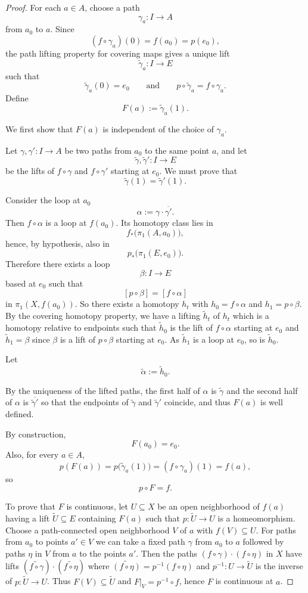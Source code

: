 \documentclass{article}
\begin{document}
\begin{proof}
For each \(a \in A\), choose a path
\[
\gamma_a : I \to A
\]
from \(a_0\) to \(a\). Since
\[
(f\circ \gamma_a)(0)=f(a_0)=p(e_0),
\]
the path lifting property for covering maps gives a unique lift
\[
\widetilde{\gamma}_a : I \to E
\]
such that
\[
\widetilde{\gamma}_a(0)=e_0
\qquad\text{and}\qquad
p\circ \widetilde{\gamma}_a=f\circ \gamma_a.
\]
Define
\[
F(a):=\widetilde{\gamma}_a(1).
\]

We first show that \(F(a)\) is independent of the choice of \(\gamma_a\).

Let \(\gamma,\gamma' : I \to A\) be two paths from \(a_0\) to the same point \(a\), and let
\[
\widetilde{\gamma},\widetilde{\gamma}' : I \to E
\]
be the lifts of \(f\circ \gamma\) and \(f\circ \gamma'\) starting at \(e_0\). We must prove that
\[
\widetilde{\gamma}(1)=\widetilde{\gamma}'(1).
\]

Consider the loop at \(a_0\)
\[
\alpha:=\gamma\cdot \overline{\gamma'}.
\]
Then \(f\circ \alpha\) is a loop at \(f(a_0)\). Its homotopy class lies in
\[
f_*\bigl(\pi_1(A,a_0)\bigr),
\]
hence, by hypothesis, also in
\[
p_*\bigl(\pi_1(E,e_0)\bigr).
\]
Therefore there exists a loop
\[
\beta : I \to E
\]
based at \(e_0\) such that
\[
[p\circ \beta]=[f\circ \alpha]
\]
in \(\pi_1(X,f(a_0))\). So there exists a homotopy $h_t$ with $h_0 = f \circ \alpha$ and $h_1 = p \circ \beta$. By the covering homotopy property, we have a lifting $\widetilde{h}_t$ of $h_t$ which is a homotopy relative to endpoints such that $\widetilde{h}_0$ is the lift of $f \circ \alpha$ starting at $e_0$ and $\widetilde{h}_1 = \beta$ since $\beta$ is a lift of $p \circ \beta$ starting at $e_0$. As $\widetilde{h}_1$ is a loop at $e_0$, so is $\widetilde{h}_0$.

Let
\[
\widetilde{\alpha} := \widetilde{h}_0.
\]

By the uniqueness of the lifted paths, the first half of $\alpha$ is $\widetilde{\gamma}$ and the second half of $\alpha$ is $\overline{\widetilde{\gamma}'}$ so that the endpoints of $\widetilde{\gamma}$ and $\widetilde{\gamma}'$ coincide, and thus \(F(a)\) is well defined.

By construction,
\[
F(a_0)=e_0.
\]
Also, for every \(a\in A\),
\[
p(F(a))
=
p\bigl(\widetilde{\gamma}_a(1)\bigr)
=
(f\circ \gamma_a)(1)
=
f(a),
\]
so
\[
p\circ F=f.
\]

To prove that \(F\) is continuous, let \(U \subseteq X\) be an open neighborhood of \(f(a)\) having a lift \(\widetilde{U} \subseteq E\)  containing \(F(a)\) such that \(p : \widetilde{U} \to U\) is a homeomorphism. Choose a path-connected open neighborhood \(V\) of \(a\) with \(f(V) \subseteq U\). For paths from \(a_0\) to points \(a' \in V\) we can take a fixed path \(\gamma\) from \(a_0\) to \(a\) followed by paths \(\eta\) in \(V\) from \(a\) to the points \(a'\). Then the paths \((f \circ \gamma )\cdot (f \circ \eta)\) in \(X\) have lifts \((\widetilde{f \circ \gamma}) \cdot (\widetilde{f \circ \eta}) \) where \(\widetilde{(f \circ \eta)} = p^{-1}(f \circ \eta)\) and \(p^{-1} :U \to \widetilde{U}\) is the inverse of \(p:\widetilde{U} \to U\). Thus \(F(V) \subseteq \widetilde{U}\) and \(F|_V = p^{-1} \circ f\), hence \(F\) is continuous at \(a\).


\end{proof}
\end{document}

